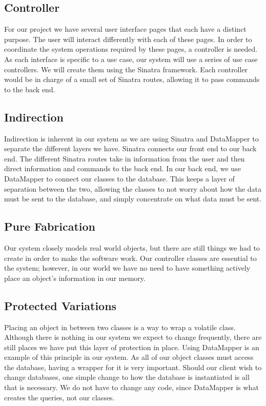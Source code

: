 \documentclass{article}
\begin{document}
\subsection{Controller}
For our project we have several user interface pages that each have a distinct purpose. The user will interact differently with each of these pages. In order to coordinate the system operations required by these pages, a controller is needed. As each interface is specific to a use case, our system will use a series of use case controllers. We will create them using the Sinatra framework. Each controller would be in charge of a small set of Sinatra routes, allowing it to pass commands to the back end.\\
\subsection{Indirection}
Indirection is inherent in our system as we are using Sinatra and DataMapper to separate the different layers we have. Sinatra connects our front end to our back end. The different Sinatra routes take in information from the user and then direct information and commands to the back end. In our back end, we use DataMapper to connect our classes to the database. This keeps a layer of separation between the two, allowing the classes to not worry about how the data must be sent to the database, and simply concentrate on what data must be sent.\\
\subsection{Pure Fabrication}
Our system closely models real world objects, but there are still things we had to create in order to make the software work. Our controller classes are essential to the system; however, in our world we have no need to have something actively place an object's information in our memory.\\
\subsection{Protected Variations}
Placing an object in between two classes is a way to wrap a volatile class. Although there is nothing in our system we expect to change frequently, there are still places we have put this layer of protection in place. Using DataMapper is an example of this principle in our system. As all of our object classes must access the database, having a wrapper for it is very important. Should our client wish to change databases, one simple change to how the database is instantiated is all that is necessary. We do not have to change any code, since DataMapper is what creates the queries, not our classes.\\
\end{document}
